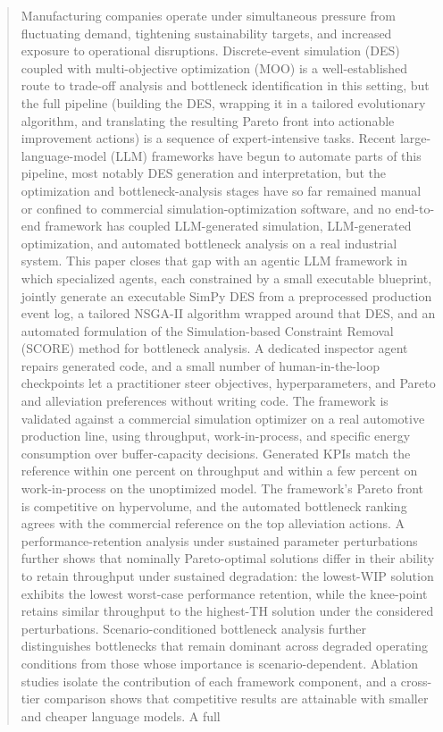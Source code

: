 \documentclass[a4paper,fleqn]{cas-sc}
\begin{document}
\begin{abstract}
Manufacturing companies operate under simultaneous pressure from fluctuating demand, tightening sustainability        
  targets, and increased exposure to operational disruptions. Discrete-event simulation (DES) coupled with              
  multi-objective optimization (MOO) is a well-established route to trade-off analysis and bottleneck identification in 
  this setting, but the full pipeline (building the DES, wrapping it in a tailored evolutionary algorithm, and translating the resulting Pareto front into actionable improvement actions) is a sequence of expert-intensive tasks.
   Recent large-language-model (LLM) frameworks have begun to automate parts of this pipeline, most notably DES
  generation and interpretation, but the optimization and bottleneck-analysis stages have so far remained manual or
  confined to commercial simulation-optimization software, and no end-to-end framework has coupled LLM-generated
  simulation, LLM-generated optimization, and automated bottleneck analysis on a real industrial system. This paper
  closes that gap with an agentic LLM framework in which specialized agents, each constrained by a small executable
  blueprint, jointly generate an executable SimPy DES from a preprocessed production event log, a tailored NSGA-II
  algorithm wrapped around that DES, and an automated formulation of the Simulation-based Constraint Removal (SCORE)
  method for bottleneck analysis. A dedicated inspector agent repairs generated code, and a small number of
  human-in-the-loop checkpoints let a practitioner steer objectives, hyperparameters, and Pareto and alleviation
  preferences without writing code. The framework is validated against a commercial simulation optimizer on a real
  automotive production line, using throughput, work-in-process, and specific energy consumption over buffer-capacity
  decisions. Generated KPIs match the reference within one percent on throughput and within a few percent on work-in-process on the unoptimized model. The framework's Pareto front is competitive on hypervolume, and the automated bottleneck ranking
  agrees with the commercial reference on the top alleviation actions. A performance-retention analysis under sustained parameter perturbations further shows that nominally Pareto-optimal solutions differ in their ability to retain throughput under sustained degradation: the lowest-WIP solution exhibits the lowest worst-case performance retention, while the knee-point retains similar throughput to the highest-TH solution under the considered perturbations. Scenario-conditioned bottleneck analysis further distinguishes bottlenecks that remain dominant across degraded operating conditions from those whose importance is scenario-dependent. Ablation studies isolate the contribution of each framework component, and a cross-tier comparison shows that competitive results are attainable with smaller and cheaper language models. A full

\end{abstract}
\end{document}
